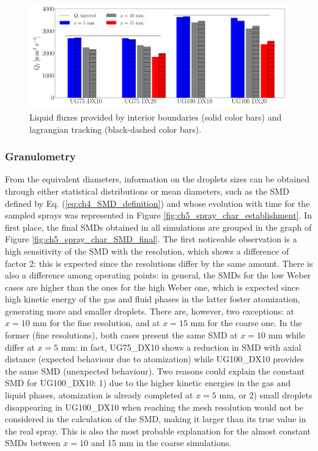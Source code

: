 \begin{figure}[ht]
	\centering
   \includegraphics[scale=0.20]{./part2_developments/figures_ch5_resolved_JICF/SPRAY_characterization/establishment_and_fluxes/fluxes_SLI_vs_IBs}
   \caption{Liquid fluxes provided by interior boundaries (solid color bars) and lagrangian tracking (black-dashed color bars).}
   \label{fig:fluxes_bargraph_IBs_vs_LGS}
\end{figure}


\subsubsection*{Granulometry}
\label{ch5:subsubsec_spray_char_granulo}

From the equivalent diameters, information on the droplets sizes can be obtained through either statistical distributions or mean diameters, such as the SMD defined by Eq. (\ref{eq:ch4_SMD_definition}) and whose evolution with time for the sampled sprays was represented in Figure \ref{fig:ch5_spray_char_establishment}. In first place, the final SMDs obtained in all simulations are grouped in the graph of Figure \ref{fig:ch5_spray_char_SMD_final}. The first noticeable observation is a high sensitivity of the SMD with the resolution, which shows a difference of factor 2: this is expected since the resolutions differ by the same amount. There is also a difference among operating points: in general, the SMDs for the low Weber cases are higher than the ones for the high Weber one, which is expected since high kinetic energy of the gas and fluid phases in the latter foster atomization, generating more and smaller droplets. There are, however, two exceptions: at $x = 10$ mm for the fine resolution, and at $x = 15$ mm for the coarse one. In the former (fine resolutions), both cases present the same SMD at $x = 10$ mm while differ at $x = 5$ mm: in fact, UG75\_DX10 shows a reduction in SMD with axial distance (expected behaviour due to atomization) while UG100\_DX10 provides the same SMD (unexpected behaviour). Two reasons could explain the constant SMD for UG100\_DX10: 1) due to the higher kinetic energies in the gas and liquid phases, atomization is already completed at $x = 5$ mm, or 2) small droplets disappearing in UG100\_DX10 when reaching the mesh resolution would not be considered in the calculation of the SMD, making it larger than its true value in the real spray. This is also the most probable explanation for the almost constant SMDs between $x = 10$ and 15 mm in the coarse simulations.


